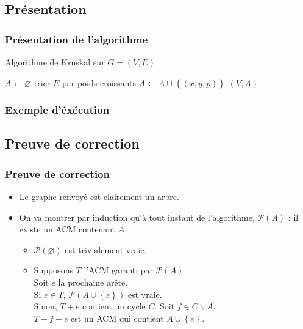 \documentclass{beamer}
\begin{document}
	\subsection{Présentation}
		\begin{frame}
			\frametitle{Présentation de l'algorithme}
				
			\begin{algorithm}[H]
				\caption{Algorithme de Kruskal sur $G=(V,E)$}
				\begin{algorithmic}[H]
					\STATE $A \leftarrow \varnothing$
					\STATE trier $E$ par poids croissants
						\STATE $A \leftarrow A \cup
						\left\{(x,y,p)\right\}$
						\ENDIF
					\ENDFOR
					\RETURN $(V,A)$
				\end{algorithmic}
			\end{algorithm}
		\end{frame}
		\begin{frame}
			\frametitle{Exemple d'éxécution}

		\end{frame}

	\subsection{Preuve de correction}
		\begin{frame}
			\frametitle{Preuve de correction}
			
			\begin{itemize}
				\item Le graphe renvoyé est clairement un arbre.
				\item On va montrer par induction qu'à tout instant de
					l'algorithme, $\mathcal{P}(A)$ : il existe un ACM
					contenant $A$. 
					\begin{itemize}
						\item $\mathcal{P}(\varnothing)$ est trivialement
							vraie.
						\item Supposons $T$ l'ACM garanti par
							$\mathcal{P}(A)$.\\
							Soit $e$ la prochaine arête.\\
							Si $e \in T$,
							$\mathcal{P}(A\cup\left\{e\right\})$
							est vraie.\\
							Sinon, $T+e$ contient un cycle $C$. Soit $f
							\in C \backslash A$.\\
							$T-f+e$ est un ACM qui contient
							$A\cup\left\{e\right\}$.
					\end{itemize}
			\end{itemize}
		\end{frame}
\end{document}
